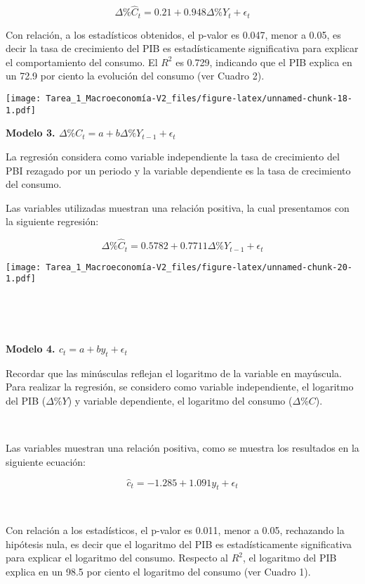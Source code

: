 \documentclass[
]{article}
\begin{document}
\[\Delta \% \hat C_t=0.21+0.948\Delta \%Y_{t}+\epsilon_t\]

Con relación, a los estadísticos obtenidos, el p-valor es 0.047, menor a
0.05, es decir la tasa de crecimiento del PIB es estadísticamente
significativa para explicar el comportamiento del consumo. El \(R^2\) es
0.729, indicando que el PIB explica en un 72.9 por ciento la evolución
del consumo (ver Cuadro 2).

\texttt{[image: Tarea\_1\_Macroeconomía-V2\_files/figure-latex/unnamed-chunk-18-1.pdf]}

\begin{center}
\textbf{Modelo 3. $\Delta \%C_t=a+b\Delta \%Y_{t-1}+\epsilon_t$}
\end{center}

La regresión considera como variable independiente la tasa de
crecimiento del PBI rezagado por un periodo y la variable dependiente es
la tasa de crecimiento del consumo.

Las variables utilizadas muestran una relación positiva, la cual
presentamos con la siguiente regresión:

\[\Delta \% \hat C_t=0.5782+0.7711\Delta \%Y_{t-1}+\epsilon_t\]

\texttt{[image: Tarea\_1\_Macroeconomía-V2\_files/figure-latex/unnamed-chunk-20-1.pdf]}

\newpage

~

~

\begin{center}
\textbf{Modelo 4. $c_t=a+by_t+\epsilon_t$}
\end{center}

Recordar que las minúsculas reflejan el logaritmo de la variable en
mayúscula. Para realizar la regresión, se considero como variable
independiente, el logaritmo del PIB (\(\Delta \%Y\)) y variable
dependiente, el logaritmo del consumo (\(\Delta \%C\)).

~

Las variables muestran una relación positiva, como se muestra los
resultados en la siguiente ecuación:

\[\hat c_t=-1.285+1.091y_t+\epsilon_t\]

~

Con relación a los estadísticos, el p-valor es 0.011, menor a 0.05,
rechazando la hipótesis nula, es decir que el logaritmo del PIB es
estadísticamente significativa para explicar el logaritmo del consumo.
Respecto al \(R^2\), el logaritmo del PIB explica en un 98.5 por ciento
el logaritmo del consumo (ver Cuadro 1).
\end{document}
